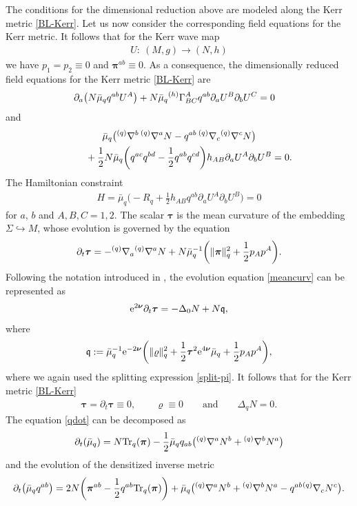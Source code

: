 \documentclass[11pt]{article}
\numberwithin{equation}{section}
\def\ptl{\partial}%
\def\mbo#1{\boldsymbol{#1}}%
\def\grad{{\nabla}}%
\newcommand{\leftexp}[2]{{\vphantom{#2}}^{#1}{#2}}
\def\halb{\frac{1}{2}}%
\numberwithin{equation}{section}
\begin{document}
The conditions for the dimensional reduction above are modeled along the Kerr metric \eqref{BL-Kerr}.
Let us now consider the corresponding field equations for the Kerr metric. It follows that for the Kerr wave map
\begin{align*}
 U \colon\ (M, g) \to (N, h)
 \end{align*}
 we have $p_1= p_2 \equiv 0$
 and $ \mbo{\pi}^{ab} \equiv 0$. As a consequence, the dimensionally reduced field equations for the Kerr metric \eqref{BL-Kerr} are
 \begin{align}
 \ptl_a \bigl(N \bar{\mu}_q q^{ab} U^A\bigr) + N \bar{\mu}_q \leftexp{(h)}{\Gamma}^{A}_{BC} q^{ab} \ptl_a U^B \ptl_b U^C&{}=0 \label{Kerr-p-dot}
 \end{align}
and
\begin{gather*}
 \bar{\mu}_q \bigl(\leftexp{(q)}{\grad}^b \, \leftexp{(q)}{\grad}^a N - q^{ab} \, \leftexp{(q)}{\grad}_c \leftexp{(q)}{\grad}^c N \bigr) \notag\\
\qquad{} + \halb N \bar{\mu}_q \biggl(q^{ac} q^{bd} - \halb q^{ab} q^{cd}\biggr) h_{AB} \ptl_a U^A \ptl_b U^B=0.
\end{gather*}
The Hamiltonian constraint
\begin{align*}
H = \bar{\mu}_q \biggl(-R_q + \halb h_{AB} q^{ab} \ptl_a U^A \ptl_b U^B\biggr) =0
\end{align*}
for $a$, $b$ and $A, B, C = 1, 2$.
The scalar $\mbo{\tau}$ is the mean curvature of the embedding $\Sigma \hookrightarrow M$, whose evolution is governed by the equation
\begin{align}\label{meancurv}
\ptl_t \mbo{\tau} = - \leftexp{(q)}{\grad}_a \leftexp{(q)}{\grad}^a N + N \bar{\mu}^{-1}_q \biggl(\Vert \mbo{\pi} \Vert_q^2 + \halb p_A p^A\biggr).
\end{align}
Following the notation introduced in \cite{kaluz1}, the evolution equation \eqref{meancurv} can be represented as
\begin{align*}
{\rm e}^{2\mbo{\nu}} \ptl_t \mbo{\tau} = - \Delta_0 N + N \mathfrak{q},
\end{align*}
where
\begin{align*}
\mathfrak{q} := \bar{\mu}^{-1}_q {\rm e}^{-2\mbo{\nu}}\biggl(\Vert \varrho \Vert^2_q + \halb \mbo{\tau}^2 {\rm e}^{4\mbo{\nu}} \bar{\mu}_q + \halb p_A p^A \biggr),
\end{align*}
where we again used the splitting expression \eqref{split-pi}. It follows that for the Kerr metric \eqref{BL-Kerr}
\begin{align}
\mbo{\tau} = \ptl_t \mbo{\tau} \equiv 0, \qquad \varrho \equiv 0 \qquad \text{and} \qquad \Delta_q N =0. \label{kerr-maximal}
\end{align}
The equation \eqref{qdot} can be decomposed as
\[
\ptl_t (\bar{\mu}_q) = N {\rm Tr}_q (\mbo{\pi}) - \halb \bar{\mu}_q q_{ab}\bigl(\leftexp{(q)}{\grad}^a N^b + \leftexp{(q)}{\grad}^b N^a \bigr)
\]
and the evolution of the densitized inverse metric
\[
\ptl_t \bigl(\bar{\mu}_q q^{ab}\bigr) = 2 N \biggl(\mbo{\pi}^{ab} - \halb q^{ab} {\rm Tr}_q(\mbo{\pi})\biggr) + \bar{\mu}_q \bigl(\leftexp{(q)}{\grad}^a N^b + \leftexp{(q)}{\grad}^b N^a - q^{ab} \leftexp{(q)}{\grad}_c N^c \bigr).
\]
\end{document}
